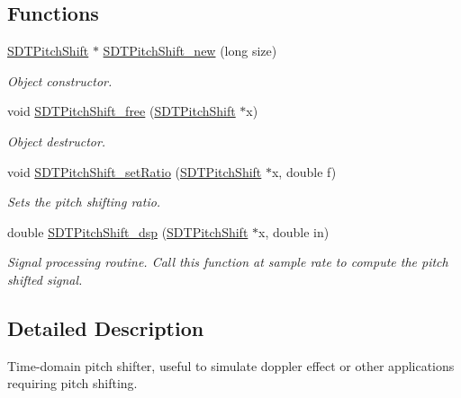 \subsection*{Functions}
\begin{DoxyCompactItemize}
\item 
\hyperlink{group__pitchshift_ga7dff86b6eec0359c1234a618d7880fc8}{S\+D\+T\+Pitch\+Shift} $\ast$ \hyperlink{group__pitchshift_gaa93d13148a303debfed6a254916350da}{S\+D\+T\+Pitch\+Shift\+\_\+new} (long size)
\begin{DoxyCompactList}\small\item\em Object constructor. \end{DoxyCompactList}\item 
void \hyperlink{group__pitchshift_ga797b695000742e91d3b6de3f0fdda906}{S\+D\+T\+Pitch\+Shift\+\_\+free} (\hyperlink{group__pitchshift_ga7dff86b6eec0359c1234a618d7880fc8}{S\+D\+T\+Pitch\+Shift} $\ast$x)
\begin{DoxyCompactList}\small\item\em Object destructor. \end{DoxyCompactList}\item 
void \hyperlink{group__pitchshift_ga3a07dff035c7fd43fa17eadb72cbbff9}{S\+D\+T\+Pitch\+Shift\+\_\+set\+Ratio} (\hyperlink{group__pitchshift_ga7dff86b6eec0359c1234a618d7880fc8}{S\+D\+T\+Pitch\+Shift} $\ast$x, double f)
\begin{DoxyCompactList}\small\item\em Sets the pitch shifting ratio. \end{DoxyCompactList}\item 
double \hyperlink{group__pitchshift_ga30c5a47a5b206c7bceb5dd100e3af3bd}{S\+D\+T\+Pitch\+Shift\+\_\+dsp} (\hyperlink{group__pitchshift_ga7dff86b6eec0359c1234a618d7880fc8}{S\+D\+T\+Pitch\+Shift} $\ast$x, double in)
\begin{DoxyCompactList}\small\item\em Signal processing routine. Call this function at sample rate to compute the pitch shifted signal. \end{DoxyCompactList}\end{DoxyCompactItemize}


\subsection{Detailed Description}
Time-\/domain pitch shifter, useful to simulate doppler effect or other applications requiring pitch shifting. 

